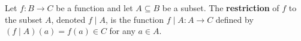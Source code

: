 Let $f: B \to C$ be a function and let $A \subseteq B$ be a subset. The \textbf{restriction} of $f$ to the subset $A$, denoted $f \mid A$, is the function $f \mid A: A \to C$ defined by $(f \mid A)(a) = f(a) \in C$ for any $a \in A$.
